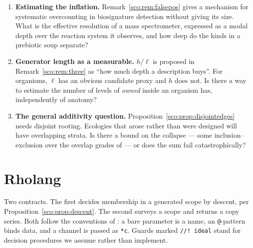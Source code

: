 \documentclass[11pt]{article}
\theoremstyle{plain}
\theoremstyle{definition}
\theoremstyle{remark}
\newcommand{\gen}{\ell}
\begin{document}
\begin{enumerate}[leftmargin=*,itemsep=5pt]
\item \textbf{Estimating the inflation.} Remark~\ref{sco:rem:falsepos}
gives a mechanism for systematic overcounting in biosignature detection
without giving its size. What is the effective resolution of a mass
spectrometer, expressed as a modal depth over the reaction system it
observes, and how deep do the kinds in a prebiotic soup separate?

\item \textbf{Generator length as a measurable.} $h/\gen$ is proposed in
Remark~\ref{sco:rem:three} as ``how much depth a description buys''. For
organisms, $\gen$ has an obvious candidate proxy and $h$ does not. Is
there a way to estimate the number of levels of \emph{owned} inside an
organism has, independently of anatomy?

\item \textbf{The general additivity question.}
Proposition~\ref{sco:prop:disjointedges} needs disjoint rooting. Ecologies
that arose rather than were designed will have overlapping strata. Is
there a bound on the collapse --- some inclusion--exclusion over the
overlap grades of \cite[\S6]{compose} --- or does the sum fail
catastrophically?

\end{enumerate}

\appendix

\section{Rholang}\label{sco:app:rho}

Two contracts. The first decides membership in a generated scope by
descent, per Proposition~\ref{sco:prop:descent}. The second surveys a
scope and returns a copy series. Both follow the conventions of
\cite[App.~A]{game}: a bare parameter is a name, an \texttt{@}-pattern
binds data, and a channel is passed as \texttt{*c}. Guards marked
\texttt{//!\ ideal} stand for decision procedures we assume rather than
implement.
\end{document}
